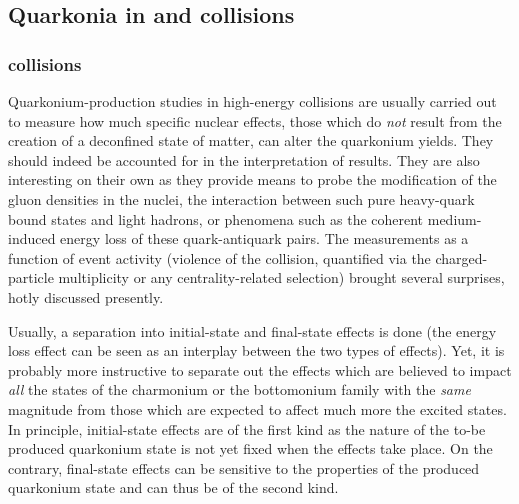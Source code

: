 \documentclass[../report.tex]{subfiles}
\begin{document}


\subsection{Quarkonia in \pPb and \pp collisions}%

\subsubsection{\pPb collisions} %
Quarkonium-production studies in high-energy \pPb collisions are usually carried out to measure how much specific nuclear effects, those which do {\it not} result from the creation of a deconfined state of matter, can alter the quarkonium yields. They should indeed be accounted for in the interpretation of \PbPb  results. They are also interesting on their own as they provide means to probe the modification of the gluon densities in the nuclei, the interaction between such pure heavy-quark bound states and light hadrons, or phenomena such as the coherent medium-induced energy loss of these quark-antiquark pairs.
The measurements as a function of event activity (violence of the collision, quantified via the charged-particle multiplicity or any centrality-related selection) brought several surprises, hotly discussed presently.
 
 Usually, a separation into initial-state and final-state effects is done (the energy loss effect can be seen as an interplay between the two types of effects). Yet, it is probably more instructive to separate out the effects which are believed to impact {\it all} the states of the charmonium or the bottomonium family with the {\it same} magnitude from those which are expected to affect much more the excited states. In principle, initial-state effects are of the first kind as the nature of the to-be produced quarkonium state is not yet fixed when the effects take place.  On the contrary, final-state effects can be sensitive to the properties of the produced quarkonium state and can thus be of the second kind.
 
\end{document}
